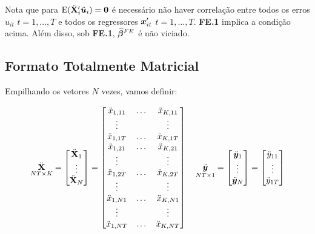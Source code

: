 \documentclass[11pt, oneside, a4paper, article]{article}
\numberwithin{equation}{section}
\begin{document}
\noindent
Nota que para $\text{E}(\ddot{\mathbf{X}}_{i}' \ddot{\boldsymbol{u}}_{i}) = \boldsymbol{0}$ é necessário não haver correlação entre todos os erros 
$u_{it}$ $t=1, \dots, T$
e todos os regressores
$\boldsymbol{x}_{it}'$ $t=1, \dots, T$.
\textbf{FE.1} implica a condição acima.
Além disso, sob \textbf{FE.1}, $\widehat{\boldsymbol{\beta}}^{FE}$ é não viciado.

\subsection*{Formato Totalmente Matricial}

Empilhando os vetores $N$ vezes, vamos definir:

\vspace{-1 em}
\begin{align*}
	\underset{NT \times K}{\ddot{\mathbf{X}}} = 
	\begin{bmatrix}
		\ddot{\mathbf{X}}_{1} \\ \vdots \\ \ddot{\mathbf{X}}_{N}
	\end{bmatrix}
	=
	\begin{bmatrix}
		\ddot{x}_{1,11} & \dots & \ddot{x}_{K, 11} \\
		\vdots          &       &  \vdots          \\
		\ddot{x}_{1,1T} & \dots & \ddot{x}_{K, 1T} \\
		\ddot{x}_{1,21} & \dots & \ddot{x}_{K, 21} \\
		\vdots          &       &  \vdots          \\
		\ddot{x}_{1,2T} & \dots & \ddot{x}_{K, 2T} \\
		\vdots          &       &  \vdots          \\
		\ddot{x}_{1,N1} & \dots & \ddot{x}_{K, N1} \\
		\vdots          &       &  \vdots          \\
		\ddot{x}_{1,NT} & \dots & \ddot{x}_{K, NT}
	\end{bmatrix}
	\quad
	\underset{NT \times 1}{\ddot{\boldsymbol{y}}} = 
	\begin{bmatrix}
		\ddot{\boldsymbol{y}}_{1} \\ \vdots \\ \ddot{\boldsymbol{y}}_{N}
	\end{bmatrix}
	=
	\begin{bmatrix}
		\ddot{y}_{11} \\ \vdots \\ \ddot{y}_{1T} \\

\end{bmatrix}
\end{align*}
\end{document}
